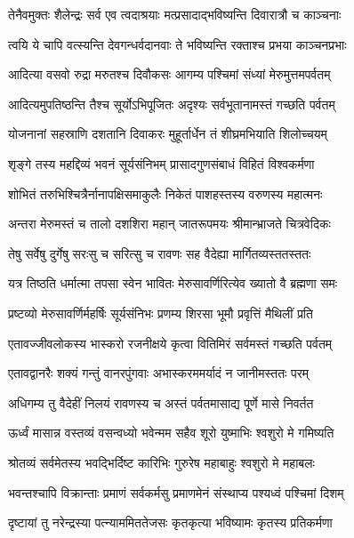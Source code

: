 \twolineshloka
{तेनैवमुक्तः शैलेन्द्रः सर्व एव त्वदाश्रयाः}
{मत्प्रसादाद्भविष्यन्ति दिवारात्रौ च काञ्चनाः} %

\twolineshloka
{त्वयि ये चापि वत्स्यन्ति देवगन्धर्वदानवाः}
{ते भविष्यन्ति रक्ताश्च प्रभया काञ्चनप्रभाः} %

\twolineshloka
{आदित्या वसवो रुद्रा मरुतश्च दिवौकसः}
{आगम्य पश्चिमां संध्यां मेरुमुत्तमपर्वतम्} %

\twolineshloka
{आदित्यमुपतिष्ठन्ति तैश्च सूर्योऽभिपूजितः}
{अदृश्यः सर्वभूतानामस्तं गच्छति पर्वतम्} %

\twolineshloka
{योजनानां सहस्राणि दशतानि दिवाकरः}
{मुहूर्तार्धेन तं शीघ्रमभियाति शिलोच्चयम्} %

\twolineshloka
{शृङ्गे तस्य महद्दिव्यं भवनं सूर्यसंनिभम्}
{प्रासादगुणसंबाधं विहितं विश्वकर्मणा} %

\twolineshloka
{शोभितं तरुभिश्चित्रैर्नानापक्षिसमाकुलैः}
{निकेतं पाशहस्तस्य वरुणस्य महात्मनः} %

\twolineshloka
{अन्तरा मेरुमस्तं च तालो दशशिरा महान्}
{जातरूपमयः श्रीमान्भ्राजते चित्रवेदिकः} %

\twolineshloka
{तेषु सर्वेषु दुर्गेषु सरःसु च सरित्सु च}
{रावणः सह वैदेह्या मार्गितव्यस्ततस्ततः} %

\twolineshloka
{यत्र तिष्ठति धर्मात्मा तपसा स्वेन भावितः}
{मेरुसावर्णिरित्येव ख्यातो वै ब्रह्मणा समः} %

\twolineshloka
{प्रष्टव्यो मेरुसावर्णिर्महर्षिः सूर्यसंनिभः}
{प्रणम्य शिरसा भूमौ प्रवृत्तिं मैथिलीं प्रति} %

\twolineshloka
{एतावज्जीवलोकस्य भास्करो रजनीक्षये}
{कृत्वा वितिमिरं सर्वमस्तं गच्छति पर्वतम्} %

\twolineshloka
{एतावद्वानरैः शक्यं गन्तुं वानरपुंगवाः}
{अभास्करममर्यादं न जानीमस्ततः परम्} %

\twolineshloka
{अधिगम्य तु वैदेहीं निलयं रावणस्य च}
{अस्तं पर्वतमासाद्य पूर्णे मासे निवर्तत} %

\twolineshloka
{ऊर्ध्वं मासान्न वस्तव्यं वसन्वध्यो भवेन्मम}
{सहैव शूरो युष्माभिः श्वशुरो मे गमिष्यति} %

\twolineshloka
{श्रोतव्यं सर्वमेतस्य भवद्भिर्दिष्ट कारिभिः}
{गुरुरेष महाबाहुः श्वशुरो मे महाबलः} %

\twolineshloka
{भवन्तश्चापि विक्रान्ताः प्रमाणं सर्वकर्मसु}
{प्रमाणमेनं संस्थाप्य पश्यध्वं पश्चिमां दिशम्} %

\twolineshloka
{दृष्टायां तु नरेन्द्रस्या पत्न्याममिततेजसः}
{कृतकृत्या भविष्यामः कृतस्य प्रतिकर्मणा} %

